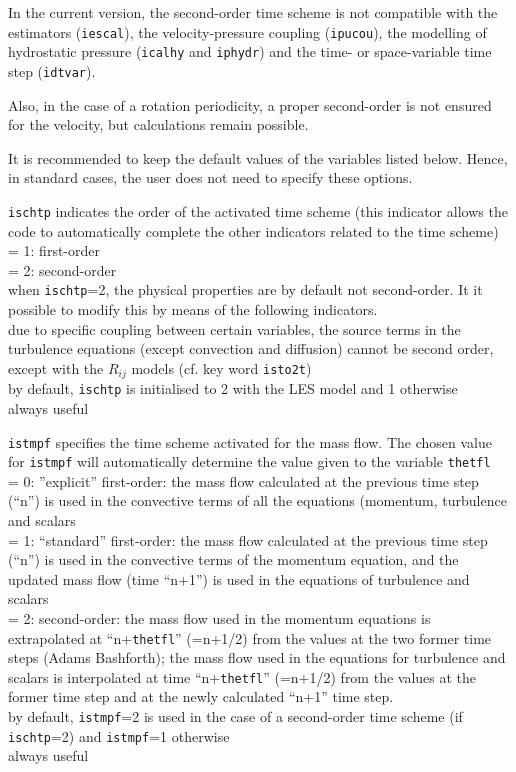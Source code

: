 In the current version, the second-order time scheme is not compatible
with the estimators ({\tt iescal}), the velocity-pressure coupling
({\tt ipucou}), the modelling of hydrostatic pressure ({\tt icalhy} and
{\tt iphydr}) and the time- or space-variable time step ({\tt idtvar}).

Also, in the case of a rotation periodicity, a proper second-order is not
ensured for the velocity, but calculations remain possible.

It is recommended to keep the default values of the variables listed
below. Hence, in standard cases, the user does not need to specify these
options.


{{\tt ischtp} indicates the order of the
activated time scheme (this indicator allows the code to automatically complete
the other indicators related to the time scheme)\\
\hspace*{1.3cm}= 1: first-order \\
\hspace*{1.3cm}= 2: second-order \\
when {\tt ischtp}=2, the physical properties are by default not
second-order. It it possible to modify this by means of the
following indicators.\\
due to specific coupling between certain variables, the source terms in the
turbulence equations (except convection and diffusion) cannot be second order,
except with the $R_{ij}$ models (cf. key word {\tt isto2t})\\
by default, {\tt ischtp} is initialised to 2 with the LES model and 1
otherwise\\
always useful}

{{\tt istmpf} specifies the time scheme activated
for the mass flow. The chosen value for {\tt istmpf} will automatically
determine the value given to the variable {\tt thetfl}\\
\hspace*{1.3cm}= 0: ''explicit'' first-order: the mass flow calculated
at the previous time step (``n'') is used in the convective terms of all
the equations (momentum, turbulence and scalars\\
\hspace*{1.3cm}= 1: ``standard'' first-order: the mass flow calculated
at the previous time step (``n'') is used in the convective terms of the
momentum equation, and the updated mass flow (time ``n+1'') is used in the
equations of turbulence and scalars\\
\hspace*{1.3cm}= 2: second-order: the mass flow used in the momentum equations
is extrapolated at ``n+{\tt thetfl}'' (=n+1/2) from the values at the two former time
steps (Adams Bashforth); the mass flow used in the equations for turbulence and
scalars is interpolated at time ``n+{\tt thetfl}'' (=n+1/2) from the values at the
former time step and at the newly calculated ``n+1'' time step.\\
by default, {\tt istmpf}=2 is used in the case of a second-order time
scheme (if {\tt ischtp}=2) and {\tt istmpf}=1 otherwise\\
always useful}

